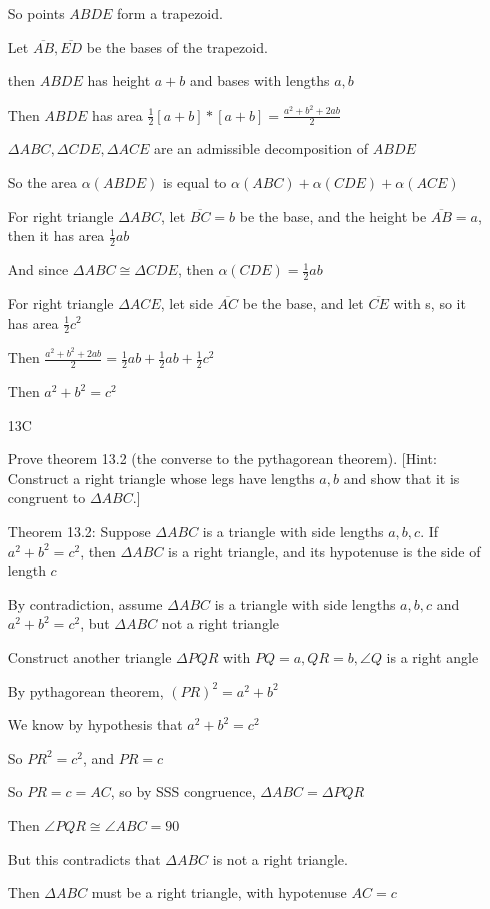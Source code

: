 \documentclass[11pt]{article}
\newcommand{\segment}[1]{\overline{#1}}
\begin{document}
\begin{itemize}
		So points $ABDE$ form a trapezoid.

		Let $\segment{AB}, \segment{ED}$ be the bases of the trapezoid.

		then $ABDE$ has height $a + b$ and bases with lengths $a, b$

		Then $ABDE$ has area $\frac{1}{2}[a + b] * [a+b] = \frac{a^2 + b^2 + 2ab}{2}$

		$\Delta ABC, \Delta CDE, \Delta ACE$ are an admissible decomposition of $ABDE$

		So the area $\alpha(ABDE)$ is equal to $\alpha(ABC) + \alpha(CDE) + \alpha(ACE)$

		For right triangle $\Delta ABC$, let $\segment{BC} = b$ be the base, and the height be $\segment{AB} = a$, then it has area $\frac{1}{2}ab$

		And since $\Delta ABC \cong \Delta CDE$, then $\alpha(CDE) = \frac{1}{2}ab$

		For right triangle $\Delta ACE$, let side $\segment{AC}$ be the base, and let $\segment{CE}$ with s, so it has area $\frac{1}{2}c^2$

		Then $\frac{a^2 + b^2 + 2ab}{2} = \frac{1}{2}ab + \frac{1}{2}ab + \frac{1}{2}c^2$

		Then $a^2 + b^2 = c^2$

	\item[13C]

		Prove theorem 13.2 (the converse to the pythagorean theorem). [Hint: Construct a right triangle whose legs have lengths $a,b$ and show that it is congruent to $\Delta ABC$.]

		Theorem 13.2: Suppose $\Delta ABC$ is a triangle with side lengths $a,b,c$. If $a^2 + b^2 = c^2$, then $\Delta ABC$ is a right triangle, and its hypotenuse is the side of length $c$

		By contradiction, assume $\Delta ABC$ is a triangle with side lengths $a,b,c$ and $a^2 + b^2 = c^2$, but $\Delta ABC$ not a right triangle

		Construct another triangle $\Delta PQR$ with $PQ = a, QR = b, \angle Q$ is a right angle

		By pythagorean theorem, $(PR)^2 = a^2 + b^2$

		We know by hypothesis that $a^2 + b^2 = c^2$

		So $PR^2 = c^2$, and $PR = c$

		So $PR = c = AC$, so by SSS congruence, $\Delta ABC = \Delta PQR$

		Then $\angle PQR \cong \angle ABC = 90$

		But this contradicts that $\Delta ABC$ is not a right triangle.

		Then $\Delta ABC$ must be a right triangle, with hypotenuse $AC = c$

\end{itemize}
\end{document}
